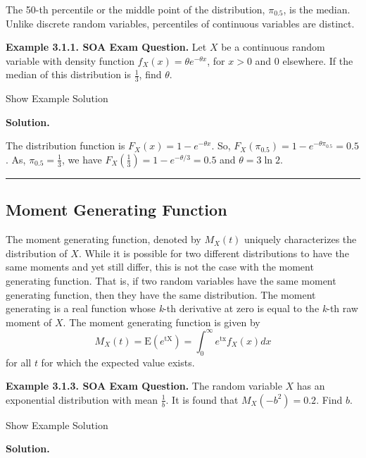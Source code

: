 \documentclass[]{book}
\theoremstyle{definition}
\theoremstyle{definition}
\theoremstyle{definition}
\theoremstyle{remark}
\begin{document}
The 50-th percentile or the middle point of the distribution,
\(\pi_{0.5}\), is the median. Unlike discrete random variables,
percentiles of continuous variables are distinct.

\textbf{Example 3.1.1. SOA Exam Question.} Let \(X\) be a continuous
random variable with density function
\(f_{X}\left( x \right) = \theta e^{- \theta x}\), for \(x > 0\) and 0
elsewhere. If the median of this distribution is \(\frac{1}{3}\), find
\(\theta\).

Show Example Solution

\hypertarget{toggleExampleLoss.1.2}{}
\textbf{Solution.}

The distribution function is
\(F_{X}\left( x \right) = 1 - e^{- \theta x}\). So,
\(F_{X}\left( \pi_{0.5} \right) = 1 - e^{- \theta\pi_{0.5}} = 0.5\). As,
\(\pi_{0.5} = \frac{1}{3}\), we have
\(F_X\left(\frac{1}{3}\right) = 1 - e^{-\theta / 3} = 0.5\) and
\(\theta = 3 \ln 2\).

\begin{center}\rule{0.5\linewidth}{\linethickness}\end{center}

\subsection{Moment Generating
Function}\label{moment-generating-function}

The moment generating function, denoted by \(M_{X}\left( t \right)\)
uniquely characterizes the distribution of \(X\). While it is possible
for two different distributions to have the same moments and yet still
differ, this is not the case with the moment generating function. That
is, if two random variables have the same moment generating function,
then they have the same distribution. The moment generating is a real
function whose \emph{k}-th derivative at zero is equal to the
\emph{k}-th raw moment of \(X\). The moment generating function is given
by
\[M_{X}\left( t \right) = \mathrm{E}\left( e^{\text{tX}} \right) = \int_{0}^{\infty}{e^{\text{tx}}f_{X}\left( x \right) dx }\]
for all \(t\) for which the expected value exists.

\textbf{Example 3.1.3. SOA Exam Question.} The random variable \(X\) has
an exponential distribution with mean \(\frac{1}{b}\). It is found that
\(M_{X}\left( - b^{2} \right) = 0.2\). Find \(b\).

Show Example Solution

\hypertarget{toggleExampleLoss.1.3}{}
\textbf{Solution.}
\end{document}
